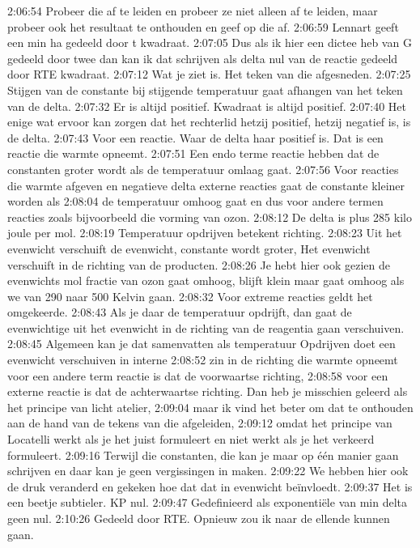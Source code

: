 2:06:54
Probeer die af te leiden en probeer ze niet alleen af te leiden, maar probeer ook het resultaat te onthouden en geef op die af.
2:06:59
Lennart geeft een min ha gedeeld door t kwadraat.
2:07:05
Dus als ik hier een dictee heb van G gedeeld door twee dan kan ik dat schrijven als delta nul van de reactie gedeeld door RTE kwadraat.
2:07:12
Wat je ziet is. Het teken van die afgesneden.
2:07:25
Stijgen van de constante bij stijgende temperatuur gaat afhangen van het teken van de delta.
2:07:32
Er is altijd positief. Kwadraat is altijd positief.
2:07:40
Het enige wat ervoor kan zorgen dat het rechterlid hetzij positief, hetzij negatief is, is de delta.
2:07:43
Voor een reactie. Waar de delta haar positief is. Dat is een reactie die warmte opneemt.
2:07:51
Een endo terme reactie hebben dat de constanten groter wordt als de temperatuur omlaag gaat.
2:07:56
Voor reacties die warmte afgeven en negatieve delta externe reacties gaat de constante kleiner worden als
2:08:04
de temperatuur omhoog gaat en dus voor andere termen reacties zoals bijvoorbeeld die vorming van ozon.
2:08:12
De delta is plus 285 kilo joule per mol.
2:08:19
Temperatuur opdrijven betekent richting.
2:08:23
Uit het evenwicht verschuift de evenwicht, constante wordt groter, Het evenwicht verschuift in de richting van de producten.
2:08:26
Je hebt hier ook gezien de evenwichts mol fractie van ozon gaat omhoog, blijft klein maar gaat omhoog als we van 290 naar 500 Kelvin gaan.
2:08:32
Voor extreme reacties geldt het omgekeerde.
2:08:43
Als je daar de temperatuur opdrijft, dan gaat de evenwichtige uit het evenwicht in de richting van de reagentia gaan verschuiven.
2:08:45
Algemeen kan je dat samenvatten als temperatuur Opdrijven doet een evenwicht verschuiven in interne
2:08:52
zin in de richting die warmte opneemt voor een andere term reactie is dat de voorwaartse richting,
2:08:58
voor een externe reactie is dat de achterwaartse richting. Dan heb je misschien geleerd als het principe van licht atelier,
2:09:04
maar ik vind het beter om dat te onthouden aan de hand van de tekens van die afgeleiden,
2:09:12
omdat het principe van Locatelli werkt als je het juist formuleert en niet werkt als je het verkeerd formuleert.
2:09:16
Terwijl die constanten, die kan je maar op één manier gaan schrijven en daar kan je geen vergissingen in maken.
2:09:22
We hebben hier ook de druk veranderd en gekeken hoe dat dat in evenwicht beïnvloedt.
2:09:37
Het is een beetje subtieler. KP nul.
2:09:47
Gedefinieerd als exponentiële van min delta geen nul.
2:10:26
Gedeeld door RTE. Opnieuw zou ik naar de ellende kunnen gaan.
